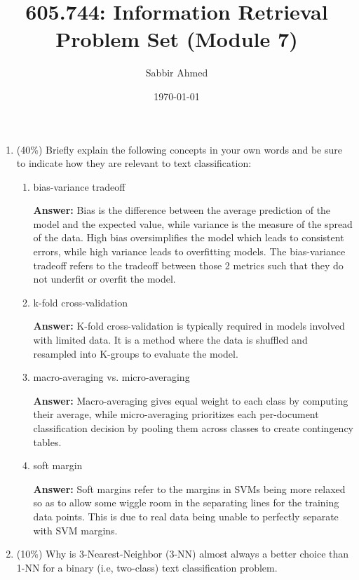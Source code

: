 \documentclass[11pt]{article}
\title{605.744: Information Retrieval \\ Problem Set (Module 7)}
\author{Sabbir Ahmed}
\date{\today}
\begin{document}
\maketitle

    \begin{enumerate}

        \item (40\%) Briefly explain the following concepts in your own words and be sure to indicate how they are relevant to text classification:
        
        \begin{enumerate}
            \item bias-variance tradeoff

            \textbf{Answer:} Bias is the difference between the average prediction of the model and the expected value, while variance is the measure of the spread of the data. High bias oversimplifies the model which leads to consistent errors, while high variance leads to overfitting models. The bias-variance tradeoff refers to the tradeoff between those 2 metrics such that they do not underfit or overfit the model.

            \item k-fold cross-validation

            \textbf{Answer:} K-fold cross-validation is typically required in models involved with limited data. It is a method where the data is shuffled and resampled into K-groups to evaluate the model.

            \item macro-averaging vs. micro-averaging

            \textbf{Answer:} Macro-averaging gives equal weight to each class by computing their average, while micro-averaging prioritizes each per-document classification decision by pooling them across classes to create contingency tables.

            \item soft margin

            \textbf{Answer:} Soft margins refer to the margins in SVMs being more relaxed so as to allow some wiggle room in the separating lines for the training data points. This is due to real data being unable to perfectly separate with SVM margins.

        \end{enumerate}

        \item (10\%) Why is 3-Nearest-Neighbor (3-NN) almost always a better choice than 1-NN for a binary (i.e, two-class) text classification problem.


\end{enumerate}
\end{document}
